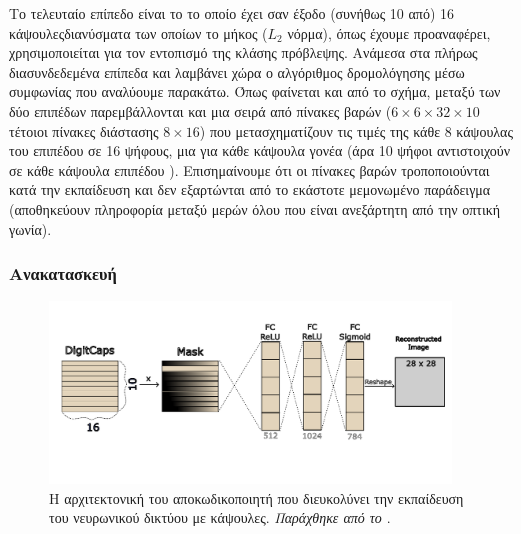Το τελευταίο επίπεδο είναι το  το οποίο έχει σαν έξοδο (συνήθως 10 από) 16 κάψουλες\textendash διανύσματα των οποίων το μήκος ($L_2$ νόρμα), όπως έχουμε προαναφέρει, χρησιμοποιείται για τον εντοπισμό της κλάσης πρόβλεψης. Ανάμεσα στα πλήρως διασυνδεδεμένα επίπεδα  και  λαμβάνει χώρα ο αλγόριθμος δρομολόγησης μέσω συμφωνίας που αναλύουμε παρακάτω. Όπως φαίνεται και από το σχήμα, μεταξύ των δύο επιπέδων παρεμβάλλονται και μια σειρά από πίνακες βαρών ($6\times 6 \times 32 \times 10$ τέτοιοι πίνακες διάστασης $8 \times 16$) που μετασχηματίζουν τις τιμές της κάθε 8 κάψουλας του επιπέδου  σε 16 ψήφους, μια για κάθε κάψουλα γονέα (άρα 10 ψήφοι αντιστοιχούν σε κάθε κάψουλα επιπέδου ). Επισημαίνουμε ότι οι πίνακες βαρών τροποποιούνται κατά την εκπαίδευση και δεν εξαρτώνται από το εκάστοτε μεμονωμένο παράδειγμα (αποθηκεύουν πληροφορία μεταξύ μερών \textendash όλου που είναι ανεξάρτητη από την οπτική γωνία).\par

\subsubsection{Ανακατασκευή}
\begin{figure}[h]
    \centering
    \includegraphics[width=0.95\textwidth]{images/chapter method/first_method_decoder.pdf}
    \caption{Η αρχιτεκτονική του αποκωδικοποιητή που διευκολύνει την εκπαίδευση του νευρωνικού δικτύου με κάψουλες. \textit{Παράχθηκε από το \href{https://inkscape.org/}{}}.}
    \label{fig:method_1_decoder_architecture}
  \end{figure}

